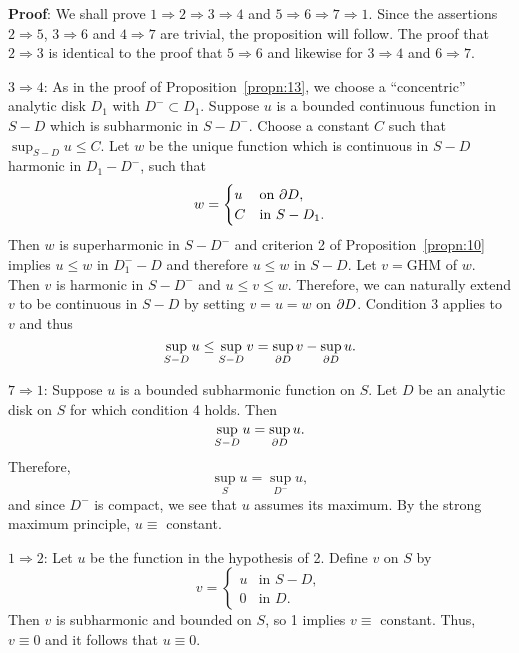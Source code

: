 \documentclass[a4paper,11pt]{article}
\begin{document}
\begin{mdframed}
  \textbf{Proof}:
  We shall prove $1 \Rightarrow 2 \Rightarrow 3 \Rightarrow 4$ and $5
  \Rightarrow 6 \Rightarrow 7 \Rightarrow 1$.  Since the assertions $2
  \Rightarrow 5$, $3 \Rightarrow 6$ and $4\Rightarrow 7$ are trivial,
  the proposition will follow.  The proof that $2 \Rightarrow 3$ is
  identical to the proof that $5 \Rightarrow 6$ and likewise for $3
  \Rightarrow 4$ and $6\Rightarrow 7$.

  $\boxed{3 \Rightarrow 4}$: As in the proof of
  Proposition~\ref{propn:13}, we choose a ``concentric'' analytic disk
  $D_1$ with $D^- \subset D_1$.  Suppose $u$ is a bounded continuous
  function in $S - D$ which is subharmonic in $S - D^-$.  Choose a
  constant $C$ such that $\sup_{S-D} u \le C$.  Let $w$ be the unique
  function which is continuous in $S-D$ harmonic in $D_1 - D^-$, such
  that
  $$
  w =
  \begin{cases}
    u &\text{on }\partial D,\\
    C &\text{in }S-D_1.
  \end{cases}
  $$
  Then $w$ is superharmonic in $S-D^-$ and criterion 2 of
  Proposition~\ref{propn:10} implies $u \le w$ in $D_1^- - D$ and
  therefore $u \le w$ in $S-D$.  Let $v = $GHM of $w$.  Then $v$ is
  harmonic in $S-D^-$ and $u \le v \le w$.  Therefore, we can
  naturally extend $v$ to be continuous in $S-D$ by setting $v = u =
  w$ on $\partial D$.  Condition 3 applies to $v$ and thus
  $$
  \sup_{S-D} u \le \sup_{S-D} v = \sup_{\partial D} v - \sup_{\partial D} u.
  $$

  $\boxed{7\Rightarrow 1}$: Suppose $u$ is a bounded subharmonic
  function on $S$.  Let $D$ be an analytic disk on $S$ for which
  condition 4 holds.  Then
  $$
  \sup_{S-D} u = \sup_{\partial D} u.
  $$
  Therefore,
  $$
  \sup_{S} u = \sup_{D^-} u,
  $$
  and since $D^-$ is compact, we see that $u$ assumes its maximum.  By
  the strong maximum principle, $u \equiv$ constant.

  $\boxed{1 \Rightarrow 2}$: Let $u$ be the function in the hypothesis
  of 2.  Define $v$ on $S$ by
  $$
  v =
  \begin{cases}
    u &\text{in }S-D,\\
    0 &\text{in }D.
  \end{cases}
  $$
  Then $v$ is subharmonic and bounded on $S$, so 1 implies $v \equiv$
  constant.  Thus, $v \equiv 0$ and it follows that $u \equiv 0$.


\end{mdframed}
\end{document}
